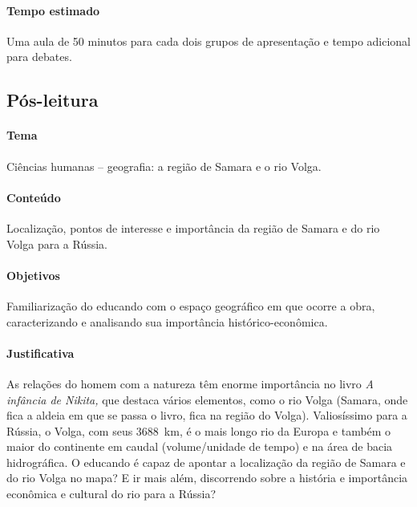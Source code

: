 \documentclass{article}
\begin{document}
\paragraph{Tempo estimado} Uma aula de 50 minutos para cada dois grupos de
apresentação e tempo adicional para debates.

\subsection{Pós-leitura}

\paragraph{Tema} Ciências humanas -- geografia: a região de Samara e o rio Volga.


\paragraph{Conteúdo}
Localização, pontos de interesse e importância da região de Samara e do
rio Volga para a Rússia.

\paragraph{Objetivos}
Familiarização do educando com o espaço geográfico em que ocorre a obra,
caracterizando e analisando sua importância histórico-econômica.

\paragraph{Justificativa}
As relações do homem com a natureza têm enorme importância no livro
\emph{A infância de Nikita,} que destaca vários elementos, como o rio
Volga (Samara, onde fica a aldeia em que se passa o livro, fica na
região do Volga). Valiosíssimo para a Rússia, o Volga, com seus 3688~km,
é o mais longo rio da Europa e também o maior do
continente em caudal (volume/unidade de tempo) e na área de bacia
hidrográfica. O educando é capaz de apontar a localização da região de
Samara e do rio Volga no mapa? E ir mais além, discorrendo sobre a
história e importância econômica e cultural do rio para a Rússia?
\end{document}
